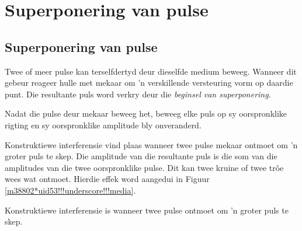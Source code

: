          \section{Superponering van pulse}
    \nopagebreak
\label{m38802*fs-id1166232432154}
            \subsection*{Superponering van pulse}
            \nopagebreak

Twee of meer pulse kan terselfdertyd deur dieselfde medium beweeg. Wanneer dit gebeur reageer hulle met mekaar om 'n verskillende versteuring vorm op daardie punt. Die resultante puls word verkry deur die \textsl{beginsel van superponering}.


Nadat die pulse deur mekaar beweeg het, beweeg elke puls op sy oorspronklike rigting en sy oorspronklike amplitude bly onveranderd. \par

Konstruktiewe interferensie vind plaas wanneer twee pulse mekaar ontmoet om 'n groter puls te skep. Die amplitude van die resultante puls is die som van die amplitudes van die twee oorspronklike pulse. Dit kan twee kruine of twee tr\^oe wees wat ontmoet. Hierdie effek word aangedui in Figuur \ref{m38802*uid53!!!underscore!!!media}.\par 

 {
     Konstruktiewe interferensie is wanneer twee pulse ontmoet om 'n groter puls te skep.
       } 
	
